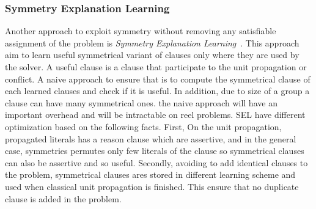 \subsubsection{Symmetry Explanation Learning}


Another approach to exploit symmetry without removing any satisfiable assignment of the problem
is \emph{Symmetry Explanation Learning}~\cite{devriendt2017symmetric}. This approach aim to learn useful 
symmetrical variant of clauses only where they are used by the solver. A useful clause is a clause that participate
to the unit propagation or conflict. 
A naive approach to ensure that is to compute the symmetrical clause of 
each learned clauses and check if it is useful. In addition, due to size of a group a clause can have many 
symmetrical ones. the naive approach will have an important overhead and will be intractable on reel problems.
SEL have different optimization based on the following facts. First,
On the unit propagation, propagated literals has a reason clause which are assertive, and in the general case,
 symmetries permutes only few literals of the clause so symmetrical clauses can also be assertive and so useful.
Secondly, avoiding to add identical clauses to the problem, symmetrical clauses ares stored in different learning scheme and used when classical unit propagation is finished. This ensure that no duplicate clause is added in the problem.
  

 





%



